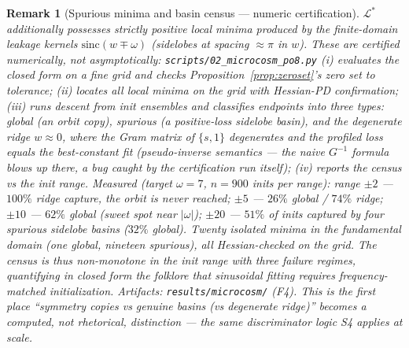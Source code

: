 \documentclass[11pt]{article}
\newtheorem{remark}[theorem]{Remark}
\begin{document}
\begin{remark}[Spurious minima and basin census — numeric certification]
$\mathcal L^*$ additionally possesses strictly positive local minima produced by the
finite-domain leakage kernels $\mathrm{sinc}(w\mp\omega)$ (sidelobes at spacing $\approx\pi$ in
$w$). These are certified numerically, not asymptotically: \texttt{scripts/02\_microcosm\_po8.py}
(i) evaluates the closed form on a fine grid and checks Proposition~\ref{prop:zeroset}'s zero set
to tolerance; (ii) locates all local minima on the grid with Hessian-PD confirmation;
(iii) runs descent from init ensembles and classifies endpoints into three types:
\emph{global} (an orbit copy), \emph{spurious} (a positive-loss sidelobe basin), and the
\emph{degenerate ridge} $w\approx0$, where the Gram matrix of $\{s,1\}$ degenerates and the
profiled loss equals the best-constant fit (pseudo-inverse semantics — the naive $G^{-1}$ formula
blows up there, a bug caught by the certification run itself); (iv) reports the census vs the
init range. Measured (target $\omega=7$, $n{=}900$ inits per range): range $\pm2$ — $100\%$ ridge
capture, the orbit is \emph{never} reached; $\pm5$ — $26\%$ global / $74\%$ ridge; $\pm10$ —
$62\%$ global (sweet spot near $|\omega|$); $\pm20$ — $51\%$ of inits captured by four spurious
sidelobe basins ($32\%$ global). Twenty isolated minima in the fundamental domain (one global,
nineteen spurious), all Hessian-checked on the grid. The census is thus \emph{non-monotone} in
the init range with three failure regimes, quantifying in closed form the folklore that sinusoidal
fitting requires frequency-matched initialization. Artifacts: \texttt{results/microcosm/} (F4).
This is the first place ``symmetry copies vs genuine basins (vs degenerate ridge)'' becomes a
computed, not rhetorical, distinction — the same discriminator logic S4 applies at scale.
\end{remark}
\end{document}
